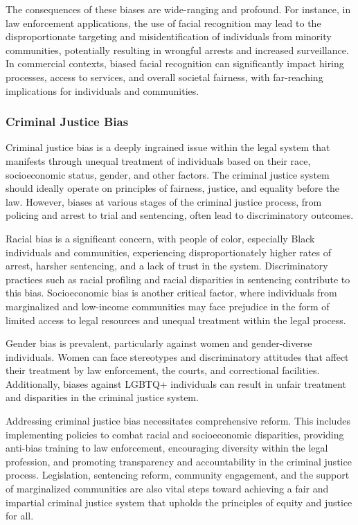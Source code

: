 \documentclass[12pt,a4paper,openright,twoside]{book}
\begin{document}
The consequences of these biases are wide-ranging and profound. For instance, in law enforcement applications, the use of facial recognition may lead to the disproportionate targeting and misidentification of individuals from minority communities, potentially resulting in wrongful arrests and increased surveillance. In commercial contexts, biased facial recognition can significantly impact hiring processes, access to services, and overall societal fairness, with far-reaching implications for individuals and communities.


\subsubsection{Criminal Justice Bias}

Criminal justice bias is a deeply ingrained issue within the legal system that manifests through unequal treatment of individuals based on their race, socioeconomic status, gender, and other factors. The criminal justice system should ideally operate on principles of fairness, justice, and equality before the law. However, biases at various stages of the criminal justice process, from policing and arrest to trial and sentencing, often lead to discriminatory outcomes. \cite{doi:10.1080/10345329.2019.1658694} 

Racial bias is a significant concern, with people of color, especially Black individuals and communities, experiencing disproportionately higher rates of arrest, harsher sentencing, and a lack of trust in the system. Discriminatory practices such as racial profiling and racial disparities in sentencing contribute to this bias. Socioeconomic bias is another critical factor, where individuals from marginalized and low-income communities may face prejudice in the form of limited access to legal resources and unequal treatment within the legal process. \cite{9660177}  

Gender bias is prevalent, particularly against women and gender-diverse individuals. Women can face stereotypes and discriminatory attitudes that affect their treatment by law enforcement, the courts, and correctional facilities. Additionally, biases against LGBTQ+ individuals can result in unfair treatment and disparities in the criminal justice system. \cite{gebru2020race} 

Addressing criminal justice bias necessitates comprehensive reform. This includes implementing policies to combat racial and socioeconomic disparities, providing anti-bias training to law enforcement, encouraging diversity within the legal profession, and promoting transparency and accountability in the criminal justice process. Legislation, sentencing reform, community engagement, and the support of marginalized communities are also vital steps toward achieving a fair and impartial criminal justice system that upholds the principles of equity and justice for all.
\end{document}
